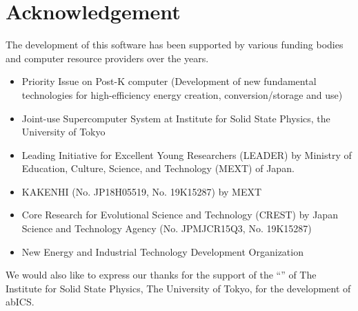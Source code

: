 \documentclass[letterpaper,10pt,english]{sphinxmanual}
\begin{document}
\chapter{Acknowledgement}
\label{\detokenize{acknowledge/index::doc}}\label{\detokenize{acknowledge/index:acknowledgement}}
The development of this software has been supported by various funding bodies and computer resource providers over the years.
\begin{itemize}
\item {} 
Priority Issue on Post-K computer (Development of new fundamental technologies for high-efficiency energy creation, conversion/storage and use)

\item {} 
Joint-use Supercomputer System at Institute for Solid State Physics, the University of Tokyo

\item {} 
Leading Initiative for Excellent Young Researchers (LEADER) by Ministry of Education, Culture, Science, and Technology (MEXT) of Japan.

\item {} 
KAKENHI (No. JP18H05519, No. 19K15287) by MEXT

\item {} 
Core Research for Evolutional Science and Technology (CREST) by Japan Science and Technology Agency (No. JPMJCR15Q3, No. 19K15287)

\item {} 
New Energy and Industrial Technology Development Organization

\end{itemize}

We would also like to express our thanks for the support of the “” of The Institute for Solid State Physics, The University of Tokyo, for the development of abICS.
\end{document}
